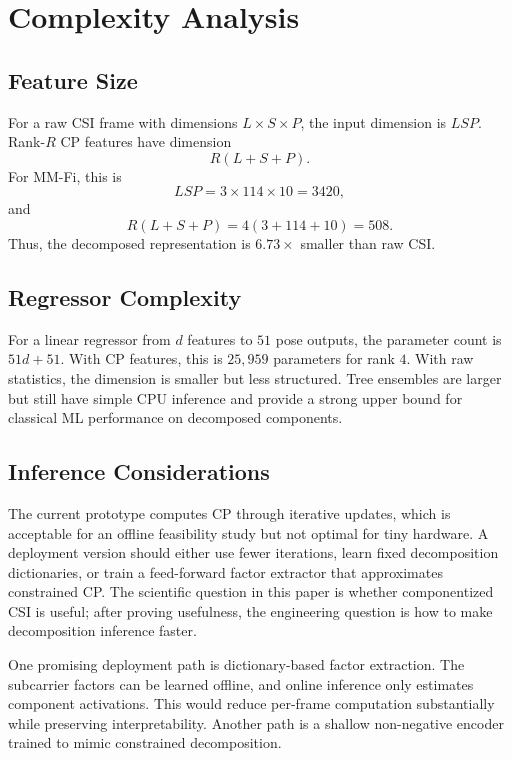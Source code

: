 \documentclass[letterpaper]{article}
\begin{document}
\section{Complexity Analysis}

\subsection{Feature Size}

For a raw CSI frame with dimensions $L\times S\times P$, the input dimension is $LSP$. Rank-$R$ CP features have dimension
\begin{equation}
    R(L+S+P).
\end{equation}
For MM-Fi, this is
\begin{equation}
    LSP=3\times114\times10=3420,
\end{equation}
and
\begin{equation}
    R(L+S+P)=4(3+114+10)=508.
\end{equation}
Thus, the decomposed representation is $6.73\times$ smaller than raw CSI.

\subsection{Regressor Complexity}

For a linear regressor from $d$ features to $51$ pose outputs, the parameter count is $51d+51$. With CP features, this is $25{,}959$ parameters for rank $4$. With raw statistics, the dimension is smaller but less structured. Tree ensembles are larger but still have simple CPU inference and provide a strong upper bound for classical ML performance on decomposed components.

\subsection{Inference Considerations}

The current prototype computes CP through iterative updates, which is acceptable for an offline feasibility study but not optimal for tiny hardware. A deployment version should either use fewer iterations, learn fixed decomposition dictionaries, or train a feed-forward factor extractor that approximates constrained CP. The scientific question in this paper is whether componentized CSI is useful; after proving usefulness, the engineering question is how to make decomposition inference faster.

One promising deployment path is dictionary-based factor extraction. The subcarrier factors can be learned offline, and online inference only estimates component activations. This would reduce per-frame computation substantially while preserving interpretability. Another path is a shallow non-negative encoder trained to mimic constrained decomposition.
\end{document}
